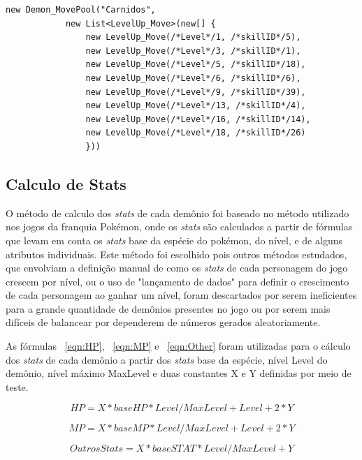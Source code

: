 \documentclass[
	12pt,				%
	openright,			%
	twoside,			%
	a4paper,			%
	english,			%
	french,				%
	spanish,			%
	brazil				%
	]{abntex2}
\begin{document}
\begin{lstlisting}
new Demon_MovePool("Carnidos", 
            new List<LevelUp_Move>(new[] {
                new LevelUp_Move(/*Level*/1, /*skillID*/5),
                new LevelUp_Move(/*Level*/3, /*skillID*/1),
                new LevelUp_Move(/*Level*/5, /*skillID*/18),
                new LevelUp_Move(/*Level*/6, /*skillID*/6),
                new LevelUp_Move(/*Level*/9, /*skillID*/39),
                new LevelUp_Move(/*Level*/13, /*skillID*/4),
                new LevelUp_Move(/*Level*/16, /*skillID*/14),
                new LevelUp_Move(/*Level*/18, /*skillID*/26)
                }))
\end{lstlisting}

\subsection{Calculo de Stats}

	O método de calculo dos \emph{stats} de cada demônio foi baseado no método utilizado nos jogos da franquia Pokémon, onde os \emph{stats} são calculados a partir de fórmulas que levam em conta os \emph{stats} base da espécie do pokémon, do nível, e de alguns atributos individuais. Este método foi escolhido pois outros métodos estudados, que envolviam a definição manual de como os \emph{stats} de cada personagem do jogo crescem por nível, ou o uso de "lançamento de dados" para definir o crescimento de cada personagem ao ganhar um nível, foram descartados por serem ineficientes para a grande quantidade de demônios presentes no jogo ou por serem mais difíceis de balancear por dependerem de números gerados aleatoriamente.
	
	As fórmulas ~\ref{eqn:HP}, ~\ref{eqn:MP} e ~\ref{eqn:Other} foram  utilizadas para o cálculo dos \emph{stats} de cada demônio a partir dos \emph{stats} base da espécie, nível Level do demônio, nível máximo MaxLevel e duas constantes X e Y definidas por meio de teste.
	
\begin{equation}
\label{eqn:HP}
HP = X*baseHP * Level/MaxLevel + Level + 2*Y
\end{equation}

\begin{equation}
\label{eqn:MP}
MP = X*baseMP * Level/MaxLevel + Level + 2*Y
\end{equation}

\begin{equation}
\label{eqn:Other}
OutrosStats = X*baseSTAT * Level/MaxLevel + Y
\end{equation}
\end{document}
